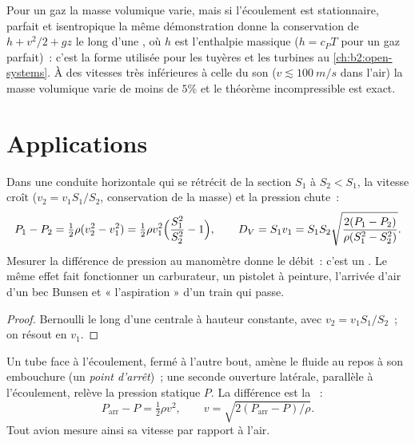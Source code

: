 \begin{remark}\label{rem:b2:euler-bernoulli:compressible}
Pour un gaz la masse volumique varie, mais si l'écoulement est stationnaire, parfait et
isentropique la même démonstration donne la conservation de $h + v^2/2 + gz$
le long d'une , où $h$ est l'enthalpie massique ($h = c_PT$
pour un gaz parfait)~: c'est la forme utilisée pour les tuyères et les turbines au
\cref{ch:b2:open-systems}. À des vitesses très inférieures à celle du son
($v \lesssim \qty{100}{m/s}$ dans l'air) la masse volumique varie de moins de $5\%$
et le théorème incompressible est exact.
\end{remark}

\section{Applications}

\begin{proposition}\label{prop:b2:euler-bernoulli:venturi}
Dans une conduite horizontale qui se rétrécit de la section $S_1$ à $S_2 < S_1$, la
vitesse croît ($v_2 = v_1S_1/S_2$, conservation de la masse) et la pression
chute~:
\[
P_1 - P_2 = \tfrac12\rho(v_2^2 - v_1^2) = \tfrac12\rho v_1^2\Bigl(\frac{S_1^2}{S_2^2} - 1\Bigr) ,
\qquad
D_V = S_1v_1 = S_1S_2\sqrt{\frac{2(P_1 - P_2)}{\rho(S_1^2 - S_2^2)}} .
\]
Mesurer la différence de pression au manomètre donne le débit~:
c'est un \emph{}. Le même effet fait fonctionner un carburateur, un
pistolet à peinture, l'arrivée d'air d'un bec Bunsen et « l'aspiration » d'un
train qui passe.
\end{proposition}

\begin{proof}
Bernoulli le long d'une  centrale à hauteur constante, avec $v_2 =
v_1S_1/S_2$~; on résout en $v_1$.
\end{proof}

\begin{proposition}\label{prop:b2:euler-bernoulli:pitot}
Un tube face à l'écoulement, fermé à l'autre bout, amène le fluide au repos
à son embouchure (un \emph{point d'arrêt})~; une seconde ouverture latérale,
parallèle à l'écoulement, relève la pression statique $P$. La différence est
la ~:
\[
P_{\text{arr}} - P = \tfrac12\rho v^2 , \qquad v = \sqrt{2(P_{\text{arr}} - P)/\rho} .
\]
Tout avion mesure ainsi sa vitesse par rapport à l'air.
\end{proposition}

